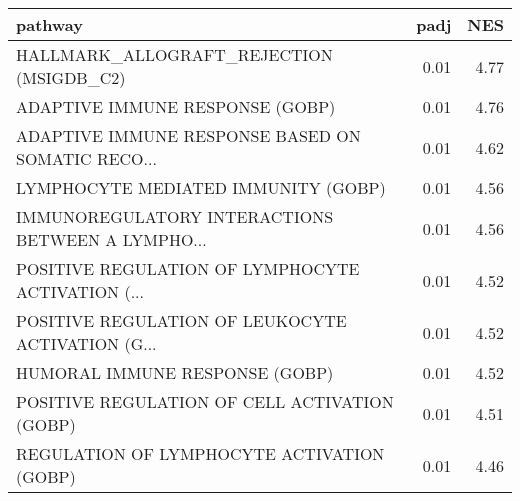 \begin{tabular}{lrr}
\toprule
                                           pathway &  padj &   NES \\
\midrule
          HALLMARK\_ALLOGRAFT\_REJECTION (MSIGDB\_C2) &  0.01 &  4.77 \\
                   ADAPTIVE IMMUNE RESPONSE (GOBP) &  0.01 &  4.76 \\
 ADAPTIVE IMMUNE RESPONSE BASED ON SOMATIC RECO... &  0.01 &  4.62 \\
               LYMPHOCYTE MEDIATED IMMUNITY (GOBP) &  0.01 &  4.56 \\
 IMMUNOREGULATORY INTERACTIONS BETWEEN A LYMPHO... &  0.01 &  4.56 \\
 POSITIVE REGULATION OF LYMPHOCYTE ACTIVATION (... &  0.01 &  4.52 \\
 POSITIVE REGULATION OF LEUKOCYTE ACTIVATION (G... &  0.01 &  4.52 \\
                    HUMORAL IMMUNE RESPONSE (GOBP) &  0.01 &  4.52 \\
     POSITIVE REGULATION OF CELL ACTIVATION (GOBP) &  0.01 &  4.51 \\
        REGULATION OF LYMPHOCYTE ACTIVATION (GOBP) &  0.01 &  4.46 \\
\bottomrule
\end{tabular}
